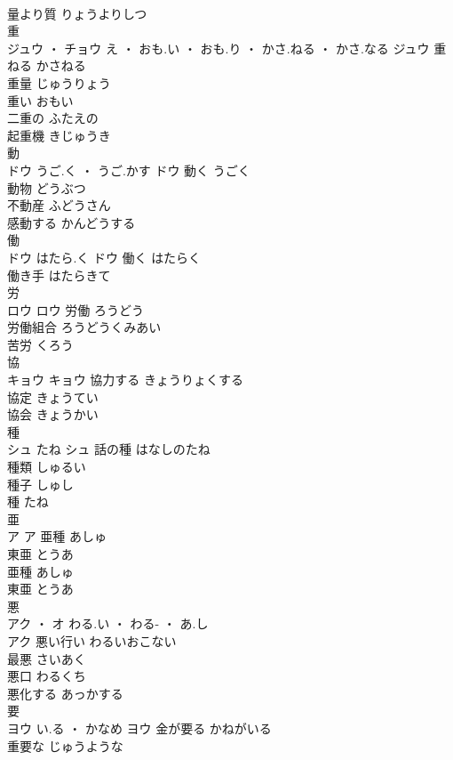 \documentclass[8pt]{extreport}
\begin{document}
\begin{CJK}{UTF8}{min}
\\	量より質	りょうよりしつ	
\\	重	
\\	ジュウ ・ チョウ	え ・ おも.い ・ おも.り ・ かさ.ねる ・ かさ.なる	ジュウ	重ねる	かさねる	
\\	重量	じゅうりょう	
\\	重い	おもい	
\\	二重の	ふたえの	
\\	起重機	きじゅうき	
\\	動	
\\	ドウ	うご.く ・ うご.かす	ドウ	動く	うごく	
\\	動物	どうぶつ	
\\	不動産	ふどうさん	
\\	感動する	かんどうする	
\\	働	
\\	ドウ	はたら.く	ドウ	働く	はたらく	
\\	働き手	はたらきて	
\\	労	
\\	ロウ		ロウ	労働	ろうどう	
\\	労働組合	ろうどうくみあい	
\\	苦労	くろう	
\\	協	
\\	キョウ		キョウ	協力する	きょうりょくする	
\\	協定	きょうてい	
\\	協会	きょうかい	
\\	種	
\\	シュ	たね	シュ	話の種	はなしのたね	
\\	種類	しゅるい	
\\	種子	しゅし	
\\	種	たね	
\\	亜	
\\	ア		ア	亜種	あしゅ	
\\	東亜	とうあ	
\\	亜種	あしゅ	
\\	東亜	とうあ	
\\	悪	
\\	アク ・ オ	わる.い ・ わる- ・ あ.し
\\	アク	悪い行い	わるいおこない	
\\	最悪	さいあく	
\\	悪口	わるくち	
\\	悪化する	あっかする	
\\	要	
\\	ヨウ	い.る ・ かなめ	ヨウ	金が要る	かねがいる	
\\	重要な	じゅうような	

\end{CJK}
\end{document}
